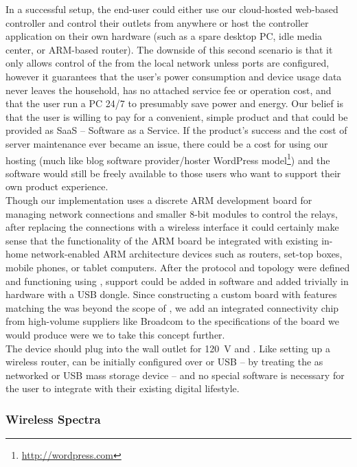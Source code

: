 In a successful setup, the end-user could either use our \netlet cloud-hosted web-based controller and control their outlets from anywhere or host the controller application on their own hardware (such as a spare desktop PC, idle media center, or ARM-based router).  The downside of this second scenario is that it only allows control of the \netlet from the local network unless ports are configured, however it guarantees that the user's power consumption and device usage data never leaves the household, has no attached service fee or operation cost, and that the user run a PC 24/7 to presumably save power and energy.  Our belief is that the user is willing to pay for a convenient, simple product and that \netlets could be provided as SaaS -- Software as a Service.  If the product's success and the cost of server maintenance ever became an issue, there could be a cost for using our hosting (much like blog software provider/hoster WordPress model\footnote{\url{http://wordpress.com}}) and the software would still be freely available to those users who want to support their own product experience.\\

Though our implementation uses a discrete ARM \arm development board for managing network connections and smaller 8-bit modules to control the relays, after replacing the \rsserial connections with a wireless interface it could certainly make sense that the functionality of the ARM board be integrated with existing in-home network-enabled ARM architecture devices such as routers, set-top boxes, mobile phones, or tablet computers.   After the protocol and topology were defined and functioning using \ethernet , \wifi support could be added in software and added trivially in hardware with a USB dongle.  Since constructing a custom board with features matching the \olimex was beyond the scope of \course, we add an integrated connectivity chip from high-volume suppliers like Broadcom to the specifications of the board we would produce were we to take this concept further.\\

The device should plug into the wall outlet for \SI{120}{\volt} and \ethernet.  Like setting up a wireless router, \wifi can be initially configured over \ethernet or USB -- by treating the \netlet as networked or USB mass storage device -- and no special software is necessary for the user to integrate \netlets with their existing digital lifestyle.\\

\subsubsection{Wireless Spectra}

